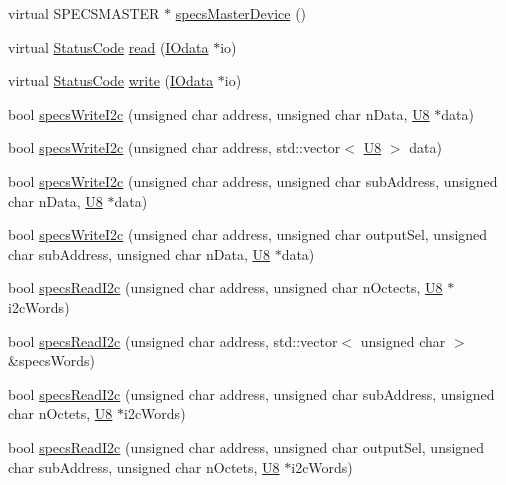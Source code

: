 \begin{DoxyCompactItemize}
\item 
virtual SPECSMASTER $\ast$ \hyperlink{classSpecsInterface_aa8aeaa74acf2c913905ea996d153a6ef}{specsMasterDevice} ()
\item 
virtual \hyperlink{classStatusCode}{StatusCode} \hyperlink{classSpecsInterface_a6f1c8ca420f08c8fca9347ca743087c5}{read} (\hyperlink{classIOdata}{IOdata} $\ast$io)
\item 
virtual \hyperlink{classStatusCode}{StatusCode} \hyperlink{classSpecsInterface_a33c7224b61bbb8d1ef20680f570ba4bd}{write} (\hyperlink{classIOdata}{IOdata} $\ast$io)
\item 
bool \hyperlink{classSpecsInterface_a20dacf68396a40eadbb740db73ff9624}{specsWriteI2c} (unsigned char address, unsigned char nData, \hyperlink{LSDelayChipV1_8h_a3cb25ca6f51f003950f9625ff05536fc}{U8} $\ast$data)
\item 
bool \hyperlink{classSpecsInterface_a00c49357f1f60e3e50de9a51fa127b79}{specsWriteI2c} (unsigned char address, std::vector$<$ \hyperlink{LSDelayChipV1_8h_a3cb25ca6f51f003950f9625ff05536fc}{U8} $>$ data)
\item 
bool \hyperlink{classSpecsInterface_a08dff9a17cd6073cd94fbd2cf7340dbd}{specsWriteI2c} (unsigned char address, unsigned char subAddress, unsigned char nData, \hyperlink{LSDelayChipV1_8h_a3cb25ca6f51f003950f9625ff05536fc}{U8} $\ast$data)
\item 
bool \hyperlink{classSpecsInterface_ae208595624e222a9ff81d112dfbf5a97}{specsWriteI2c} (unsigned char address, unsigned char outputSel, unsigned char subAddress, unsigned char nData, \hyperlink{LSDelayChipV1_8h_a3cb25ca6f51f003950f9625ff05536fc}{U8} $\ast$data)
\item 
bool \hyperlink{classSpecsInterface_a7e9a0fe69a998e624ca2d7339b61bcb5}{specsReadI2c} (unsigned char address, unsigned char nOctects, \hyperlink{LSDelayChipV1_8h_a3cb25ca6f51f003950f9625ff05536fc}{U8} $\ast$i2cWords)
\item 
bool \hyperlink{classSpecsInterface_ab61d866ec9b8a48e84a867004c1ed662}{specsReadI2c} (unsigned char address, std::vector$<$ unsigned char $>$ \&specsWords)
\item 
bool \hyperlink{classSpecsInterface_acbc22fab91e3dbd33f83b324750baa1f}{specsReadI2c} (unsigned char address, unsigned char subAddress, unsigned char nOctets, \hyperlink{LSDelayChipV1_8h_a3cb25ca6f51f003950f9625ff05536fc}{U8} $\ast$i2cWords)
\item 
bool \hyperlink{classSpecsInterface_ad27047eaae1bc333ee0c1a6c871a407b}{specsReadI2c} (unsigned char address, unsigned char outputSel, unsigned char subAddress, unsigned char nOctets, \hyperlink{LSDelayChipV1_8h_a3cb25ca6f51f003950f9625ff05536fc}{U8} $\ast$i2cWords)

\end{DoxyCompactItemize}
